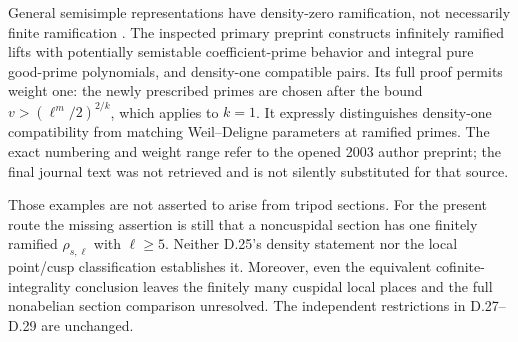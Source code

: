 General semisimple representations have density-zero
ramification, not necessarily finite ramification
\citep[Theorem~1]{D_KhareRajan2000}.
The inspected primary preprint
\citep[Section~2.2, Main Theorem; Section~2.4, Corollary~14]
{D_KhareLarsenRamakrishna2003}
constructs infinitely ramified lifts with potentially
semistable coefficient-prime behavior and integral pure
good-prime polynomials, and density-one compatible pairs.
Its full proof permits weight one: the newly prescribed
primes are chosen after the bound
$v>(\ell^m/2)^{2/k}$, which applies to $k=1$.
It expressly distinguishes density-one compatibility from
matching Weil--Deligne parameters at ramified primes.
The exact numbering and weight range refer to the opened
2003 author preprint; the final journal text was not
retrieved and is not silently substituted for that source.

Those examples are not asserted to arise from tripod
sections. For the present route the missing assertion is
still that a noncuspidal section has one finitely ramified
$\rho_{s,\ell}$ with $\ell\ge5$.
Neither D.25's density statement nor the local
point/cusp classification establishes it.
Moreover, even the equivalent cofinite-integrality
conclusion leaves the finitely many cuspidal local places
and the full nonabelian section comparison unresolved.
The independent restrictions in D.27--D.29 are unchanged.
